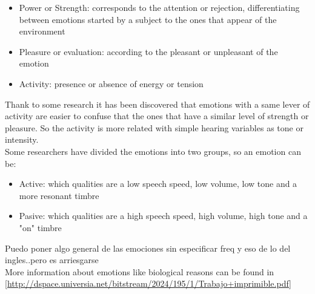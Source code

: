 \begin{itemize}
	\item Power or Strength: corresponds to the attention or rejection, differentiating between emotions started by a subject to the ones that appear of the environment
	\item Pleasure or evaluation: according to the pleasant or unpleasant of the emotion
	\item Activity: presence or absence of energy or tension
\end{itemize}
Thank to some research it has been discovered that emotions with a same lever of activity are easier to confuse that the ones that have a similar level of strength or pleasure. So the activity is more related with simple hearing variables as tone or intensity.\\
Some researchers have divided the emotions into two groups, so an emotion can be:
\begin{itemize}
	\item Active: which qualities are a low speech speed, low volume, low tone and a more resonant timbre
	\item Pasive: which qualities are a high speech speed, high volume, high tone and a "on" timbre
\end{itemize}
Puedo poner algo general de las emociones sin especificar freq y eso de lo del ingles..pero es arriesgarse\\
More information about emotions like biological reasons can be found in \ref{http://dspace.universia.net/bitstream/2024/195/1/Trabajo+imprimible.pdf}
